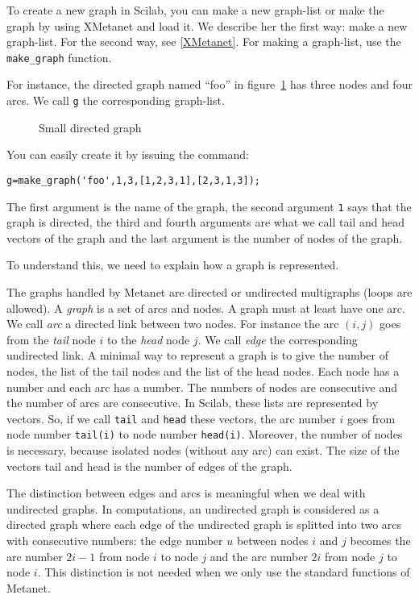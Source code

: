 \documentclass[11pt]{report}
\newcommand{\T}[1]{{\tt #1}}
\begin{document}
To create a new graph in Scilab, you can make a new graph-list or make the
graph by using XMetanet and load it. We describe her
the first way: make a new graph-list. For the second way, see \ref{XMetanet}.
For making a graph-list, use the
\T{make\_graph} function.

For instance, the directed graph named ``foo'' in figure~\ref{fig-small}
has three nodes and four
arcs. We call \T{g} the corresponding graph-list.

\begin{figure}
  \centerline{}
  \caption{Small directed graph}
  \label{fig-small}
\end{figure}

You can easily create it by issuing the command:

\begin{verbatim}
g=make_graph('foo',1,3,[1,2,3,1],[2,3,1,3]);
\end{verbatim}

The first argument is the name of the graph,
the second argument \T{1} says that the graph is directed, the third
and fourth arguments are what we call tail
and head
vectors of 
the graph and the last argument is the number of nodes of the graph.

To understand this, we need to explain how a graph is represented.

The graphs handled by Metanet are directed or undirected multigraphs 
(loops are allowed). 
A {\em graph}
is a set of arcs and nodes. A graph must at least have one arc. 
We call {\em arc} a directed link between two nodes. 
For instance the arc $(i,j)$ goes from the {\em tail}
node $i$ to the {\em head}
node $j$. 
We call {\em edge} the 
corresponding undirected link. A minimal way to represent a graph is to
give the number of nodes, the list of the tail nodes and the list of the
head nodes. Each node has a number and each arc has a number. The numbers
of nodes are consecutive and the number of arcs are consecutive. In Scilab,
these lists are represented by vectors. So, if we call \T{tail} and
\T{head} these vectors, the arc number $i$ goes from node
number \T{tail(i)} to node number \T{head(i)}. Moreover, the number of
nodes is necessary, because isolated nodes (without any arc) can exist. The
size of the vectors tail and head is the number of edges of the graph.

The distinction between edges and arcs is meaningful when we deal with
undirected graphs. In computations, an undirected graph is considered as a
directed graph where each edge of the undirected graph is splitted into two
arcs with consecutive numbers: the edge  number $u$ between nodes $i$ and $j$
becomes the arc  number $2i-1$ from node $i$ to node $j$ and the arc 
 number
$2i$ from node $j$ to node $i$. This distinction is not needed when we
only use the standard functions of Metanet.
\end{document}
